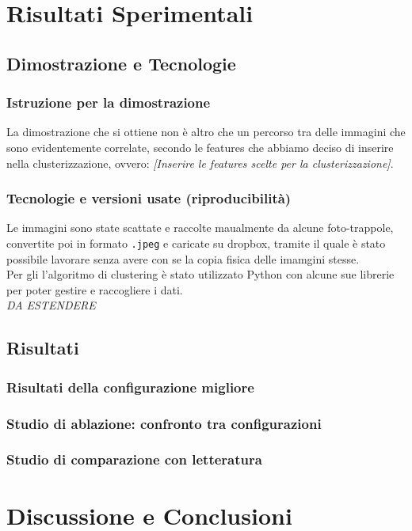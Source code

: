 \documentclass[12pt,a4paper,twoside]{article}
\begin{document}
\newpage
\section{Risultati Sperimentali}

\subsection{Dimostrazione e Tecnologie}
\subsubsection{Istruzione per la dimostrazione}
La dimostrazione che si ottiene non è altro che un percorso tra delle immagini che sono 
evidentemente correlate, secondo le features che abbiamo deciso di inserire nella clusterizzazione, 
ovvero: \textit{[Inserire le features scelte per la clusterizzazione]}.
\subsubsection{Tecnologie e versioni usate (riproducibilità)}
Le immagini sono state scattate e raccolte maualmente da alcune foto-trappole, convertite poi in 
formato \texttt{.jpeg} e caricate su dropbox, tramite il quale è stato possibile lavorare senza 
avere con se la copia fisica delle imamgini stesse.\\ 
Per gli l'algoritmo di clustering è stato utilizzato Python con alcune sue librerie per poter 
gestire e raccogliere i dati.\\
\textit{DA ESTENDERE} 

\subsection{Risultati}
\subsubsection{Risultati della configurazione migliore}
\subsubsection{Studio di ablazione: confronto tra configurazioni}
\subsubsection{Studio di comparazione con letteratura}


\newpage
\section{Discussione e Conclusioni}
\end{document}
